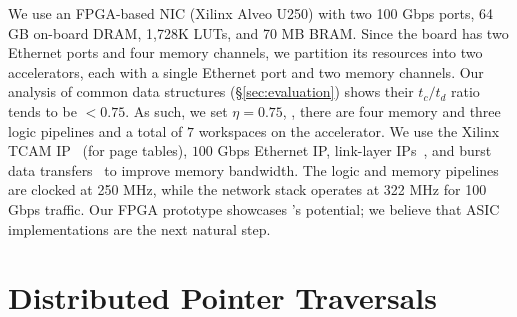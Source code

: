  We use an FPGA-based NIC (Xilinx Alveo U250) with two 100 Gbps ports, 64 GB on-board DRAM, 1,728K LUTs, and 70 MB BRAM. Since the board has two Ethernet ports and four memory channels, we partition its resources into two \name accelerators, each with a single Ethernet port and two memory channels. Our analysis of common data structures (\S\ref{sec:evaluation}) shows their $t_c/t_d$ ratio tends to be $<0.75$. As such, we set $\eta=0.75$, \ie, there are four memory and three logic pipelines and a total of $7$ workspaces on the accelerator.
We use the Xilinx TCAM IP~\cite{tcam_ip} (for page tables), $100$ Gbps Ethernet IP, link-layer IPs~\cite{xilinx_network}, and burst data transfers~\cite{burstdatatransfer} to improve memory bandwidth. The logic and memory pipelines are clocked at 250 MHz, while the network stack operates at 322 MHz for 100 Gbps traffic. Our FPGA prototype showcases \name's potential; we believe that ASIC implementations are the next natural step. 



\section{Distributed Pointer Traversals}
\label{sec:distributed}


